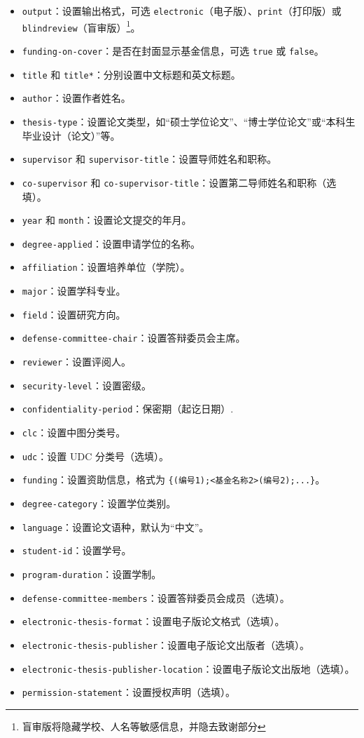 \begin{itemize}
    \item \texttt{output}：设置输出格式，可选 \texttt{electronic}（电子版）、\texttt{print}（打印版）或\texttt{blindreview}（盲审版）\footnote{盲审版将隐藏学校、人名等敏感信息，并隐去致谢部分}。
    \item \texttt{funding-on-cover}：是否在封面显示基金信息，可选 \texttt{true} 或 \texttt{false}。
    \item \texttt{title} 和 \texttt{title*}：分别设置中文标题和英文标题。
    \item \texttt{author}：设置作者姓名。
    \item \texttt{thesis-type}：设置论文类型，如“硕士学位论文”、“博士学位论文”或“本科生毕业设计（论文）”等。
    \item \texttt{supervisor} 和 \texttt{supervisor-title}：设置导师姓名和职称。
    \item \texttt{co-supervisor} 和 \texttt{co-supervisor-title}：设置第二导师姓名和职称（选填）。
    \item \texttt{year} 和 \texttt{month}：设置论文提交的年月。
    \item \texttt{degree-applied}：设置申请学位的名称。
    \item \texttt{affiliation}：设置培养单位（学院）。
    \item \texttt{major}：设置学科专业。
    \item \texttt{field}：设置研究方向。
    \item \texttt{defense-committee-chair}：设置答辩委员会主席。
    \item \texttt{reviewer}：设置评阅人。
    \item \texttt{security-level}：设置密级。
    \item \texttt{confidentiality-period}：保密期（起讫日期）.
    \item \texttt{clc}：设置中图分类号。
    \item \texttt{udc}：设置 UDC 分类号（选填）。
    \item \texttt{funding}：设置资助信息，格式为 \texttt{\{<基金名称1>(编号1);<基金名称2>(编号2);...\}}。
    \item \texttt{degree-category}：设置学位类别。
    \item \texttt{language}：设置论文语种，默认为“中文”。
    \item \texttt{student-id}：设置学号。
    \item \texttt{program-duration}：设置学制。
    \item \texttt{defense-committee-members}：设置答辩委员会成员（选填）。
    \item \texttt{electronic-thesis-format}：设置电子版论文格式（选填）。
    \item \texttt{electronic-thesis-publisher}：设置电子版论文出版者（选填）。
    \item \texttt{electronic-thesis-publisher-location}：设置电子版论文出版地（选填）。
    \item \texttt{permission-statement}：设置授权声明（选填）。
\end{itemize}

